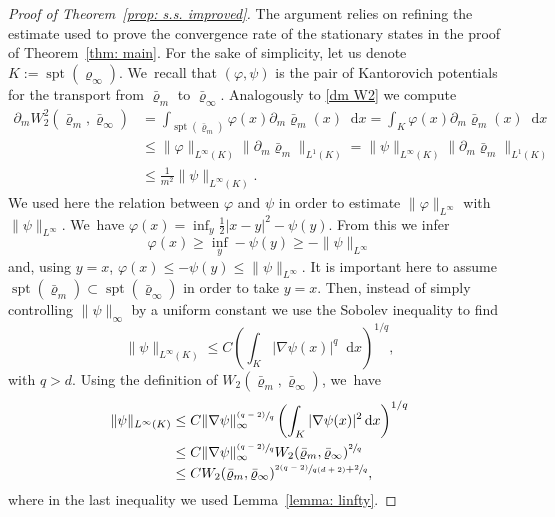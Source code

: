 \documentclass[10pt]{amsart}
\newcommand{\psfrac}[2]{\sfrac{(#1)}{#2}}
\DeclareMathOperator{\spt}{spt}
\newcommand{\dx}[1]{\mathop{}\!\mathrm{d} #1}
\theoremstyle{plain}
\theoremstyle{remark}
\begin{document}
\begin{proof}[Proof of Theorem~\ref{prop: s.s. improved}]

The argument relies on refining the estimate used to prove the convergence rate of the stationary states in the proof of Theorem~\ref{thm: main}. For the sake of simplicity, let us denote $K:=\spt(\varrho_\infty)$. We~recall that $(\varphi,\psi)$ is the pair of Kantorovich potentials for the transport from $\bar\varrho_m$ to $\bar\varrho_\infty$. Analogously to \eqref{dm W2} we compute
\begin{equation}\label{dm W2 new}
\begin{aligned}
\partial_m W_2^2(\bar\varrho_m, \bar\varrho_\infty)&= \int_{\spt{(\bar\varrho_m)}} \varphi (x) \partial_m \bar\varrho_m(x) \dx x= \int_{K} \varphi (x) \partial_m \bar\varrho_m(x) \dx x\\
&\leq \|\varphi\|_{L^\infty(K)} \|\partial_m \bar\varrho_m\|_{L^1(K)}=\|\psi\|_{L^\infty(K)} \|\partial_m \bar\varrho_m\|_{L^1(K)}\\
&\leq \frac{1}{m^2} \|\psi\|_{L^\infty(K)}.
\end{aligned}
\end{equation}
We used here the relation between $\varphi$ and $\psi $ in order to estimate $\|\varphi\|_{L^\infty}$ with $\|\psi\|_{L^\infty}$. We~have $\varphi(x)=\inf_y \frac12|x-y|^2-\psi(y)$. From this we infer
\[
\varphi(x)\geq \inf_y-\psi(y)\geq -\|\psi\|_{L^\infty}
\]
and, using $y=x$, $\varphi(x)\leq-\psi(y)\leq \|\psi\|_{L^\infty}$. It is important here to assume $\spt(\bar\varrho_m)\subset\spt (\bar\varrho_\infty)$ in order to take $y=x$. Then, instead of simply controlling $\|\psi\|_\infty$ by a uniform constant we use the Sobolev inequality to find
\begin{equation*}
\|\psi\|_{L^\infty(K)} \leq C \left(\int_{K} |\nabla \psi(x)|^{q} \dx x\right)^{1/{ q}},
\end{equation*}
with ${q}>d$. Using the definition of $W_2(\bar\varrho_m,\bar\varrho_\infty)$, we~have
\begin{align*}
\|\psi\|_{L^\infty(K)} &\leq {C}\|\nabla \psi\|_\infty^{\psfrac{{ q}-2}{{q}}} \left(\int_{K} |\nabla \psi(x)|^2 \dx x\right)^{1/{q}}\\
&\leq {C}\|\nabla \psi\|_\infty^{\psfrac{{ q}-2}{{q}}} W_2(\bar\varrho_m,\bar\varrho_\infty)^{\sfrac 2{q}}\\
&\leq { C}W_2(\bar\varrho_m,\bar\varrho_\infty)^{\sfrac{2({ q}-2)}{{ q}(d+2)} +\sfrac 2{ q}},
\end{align*}
where in the last inequality we used Lemma~\ref{lemma: linfty}.

\end{proof}
\end{document}
